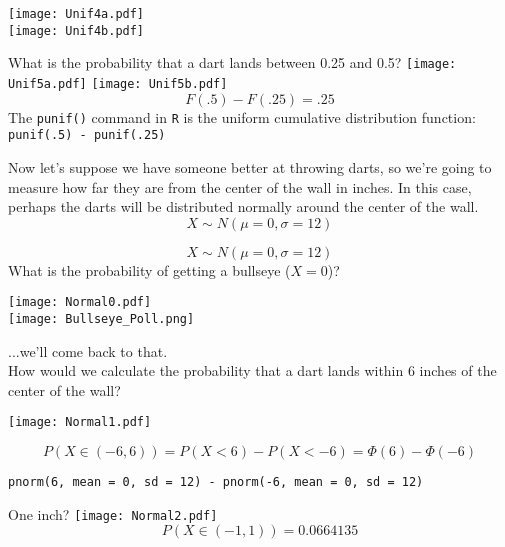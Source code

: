 \documentclass{beamer}
\begin{document}
\begin{frame}
\centering
\texttt{[image: Unif4a.pdf]} \\
\texttt{[image: Unif4b.pdf]}
\end{frame}

\begin{frame}
What is the probability that a dart lands between 0.25 and 0.5?
\pause
\texttt{[image: Unif5a.pdf]}
\texttt{[image: Unif5b.pdf]} \\
\pause
$$F(.5) - F(.25) = .25$$
\pause
The \texttt{punif()} command in \texttt{R} is the uniform cumulative distribution function:
\texttt{punif(.5) - punif(.25)}
\end{frame}

\begin{frame}

Now let's suppose we have someone better at throwing darts, so we're going to measure how far they are from the center of the wall in inches. In this case, perhaps the darts will be distributed \alert{normally} around the center of the wall.
$$X\sim N(\mu = 0, \sigma = 12)$$
\end{frame}

\begin{frame}
$$X\sim N(\mu = 0, \sigma = 12)$$
What is the probability of getting a bullseye ($X=0$)?
\\
\begin{center}
\texttt{[image: Normal0.pdf]} \\
\texttt{[image: Bullseye\_Poll.png]}
\end{center}
\end{frame}

\begin{frame}
...we'll come back to that. \\
How would we calculate the probability that a dart lands within 6 inches of the center of the wall?
\pause
\begin{center}\texttt{[image: Normal1.pdf]}
\end{center}
\pause
$$P(X\in(-6,6)) = P(X<6)-P(X<-6) = \Phi(6) - \Phi(-6)$$
\pause
\begin{footnotesize}\texttt{pnorm(6, mean = 0, sd = 12) - pnorm(-6, mean = 0, sd = 12)}\end{footnotesize}
\end{frame}

\begin{frame}{One inch?}
\centering\texttt{[image: Normal2.pdf]}
\pause
$$P(X\in(-1, 1))=0.0664135$$
\end{frame}
\end{document}
